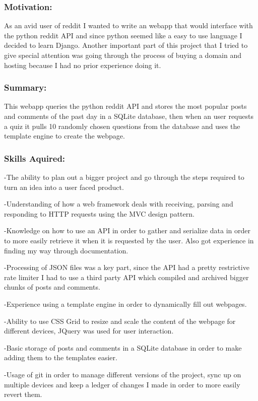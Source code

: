 \documentclass[a4paper,hidelinks,12pt]{article}
\begin{document}
\subsubsection{Motivation:}
As an avid user of reddit I wanted to write an webapp that would interface with the python reddit API and
since python seemed like a easy to use language I decided to learn Django. Another important part of this
project that I tried to give special attention was going through the process of buying a domain and hosting
because I had no prior experience doing it.

\subsubsection{Summary:}
This webapp queries the python reddit API and stores the most popular posts and comments of the past day
in a SQLite database, then when an user requests a quiz it pulls 10 randomly chosen questions from the
database and uses the template engine to create the webpage.
\subsubsection{Skills Aquired:}

-The ability to plan out a bigger project and go through the steps required to turn an idea into a user faced
product.

-Understanding of how a web framework deals with receiving, parsing and responding to HTTP requests using
the MVC design pattern.

-Knowledge on how to use an API in order to gather and serialize data in order to more easily retrieve it
when it is requested by the user. Also got experience in finding my way through documentation.

-Processing of JSON files was a key part, since the API had a pretty restrictive rate limiter I had to use a
third party API which compiled and archived bigger chunks of posts and comments.

-Experience using a template engine in order to dynamically fill out webpages.

-Ability to use CSS Grid to resize and scale the content of the webpage for different devices, JQuery was used
for user interaction.

-Basic storage of posts and comments in a SQLite database in order to make adding them to the templates easier.

-Usage of git in order to manage different versions of the project, sync up on multiple devices and keep a
ledger of changes I made in order to more easily revert them.
\end{document}
